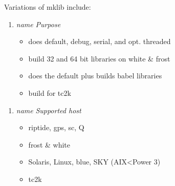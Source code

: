 Variations of mklib include:
\begin{enumerate}
   \item \textit{name}          \textit{Purpose}
   \begin{itemize}
   \item  {}        does default, debug, serial, and opt. threaded
   \item  {}    build 32 and 64 bit libraries on white & frost
   \item  {}  does the default plus builds babel libraries
   \item  {}   build for tc2k
   \end{itemize}
\end{enumerate}
\begin{enumerate}
   \item \textit{name}          \textit{Supported host}
   \begin{itemize}
   \item  {}        riptide, gps, sc, Q
   \item  {}    frost & white
   \item  {}  Solaris, Linux, blue, SKY (AIX<Power 3)
   \item  {}   tc2k
   \end{itemize}
\end{enumerate}
